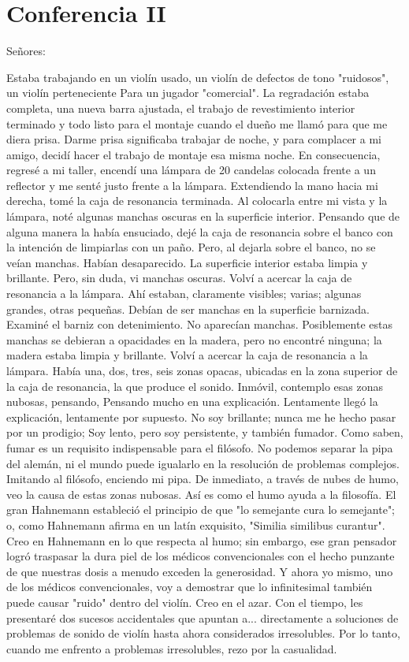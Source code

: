 \chapter*{Conferencia II}
Señores:

Estaba trabajando en un violín usado,
un violín de defectos de tono "ruidosos", un violín perteneciente
Para un jugador "comercial". La regradación estaba completa, una nueva barra ajustada, el trabajo de revestimiento interior terminado y todo listo para el montaje cuando el dueño me llamó para que me diera prisa. Darme prisa significaba trabajar de noche, y para complacer a mi amigo, decidí hacer el trabajo de montaje esa misma noche. En consecuencia, regresé a mi taller, encendí una lámpara de 20 candelas colocada frente a un reflector y me senté justo frente a la lámpara.
Extendiendo la mano hacia mi derecha, tomé la caja de resonancia terminada. Al colocarla entre mi vista y la lámpara, noté algunas manchas oscuras en la superficie interior. Pensando que de alguna manera la había ensuciado, dejé la caja de resonancia sobre el banco con la intención de limpiarlas con un paño. Pero, al dejarla sobre el banco, no se veían manchas. Habían desaparecido. La superficie interior estaba limpia y brillante. Pero, sin duda, vi manchas oscuras. Volví a acercar la caja de resonancia a la lámpara. Ahí estaban, claramente visibles; varias; algunas grandes, otras pequeñas. Debían de ser manchas en la superficie barnizada. Examiné el barniz con detenimiento. No aparecían manchas. Posiblemente estas manchas se debieran a opacidades en la madera, pero no encontré ninguna; la madera estaba limpia y brillante. Volví a acercar la caja de resonancia a la lámpara. Había una, dos, tres, seis zonas opacas, ubicadas en la zona superior de la caja de resonancia, la que produce el sonido.
Inmóvil, contemplo esas zonas nubosas, pensando,
Pensando mucho en una explicación. Lentamente llegó la explicación, lentamente por supuesto. No soy brillante; nunca me he hecho pasar por un prodigio; Soy lento, pero soy persistente, y también fumador. Como saben, fumar es un requisito indispensable para el filósofo. No podemos separar la pipa del alemán, ni el mundo puede igualarlo en la resolución de problemas complejos. Imitando al filósofo, enciendo mi pipa. De inmediato, a través de nubes de humo, veo la causa de estas zonas nubosas. Así es como el humo ayuda a la filosofía. El gran Hahnemann estableció el principio de que "lo semejante cura lo semejante"; o, como Hahnemann afirma en un latín exquisito, "Similia similibus curantur". Creo en Hahnemann en lo que respecta al humo; sin embargo, ese gran pensador logró traspasar la dura piel de los médicos convencionales con el hecho punzante de que nuestras dosis a menudo exceden la generosidad. Y ahora yo mismo, uno de los médicos convencionales, voy a demostrar que lo infinitesimal también puede causar "ruido" dentro del violín. Creo en el azar. Con el tiempo, les presentaré dos sucesos accidentales que apuntan a... directamente a soluciones de problemas de sonido de violín hasta ahora considerados irresolubles. Por lo tanto, cuando me enfrento a problemas irresolubles, rezo por la casualidad.
